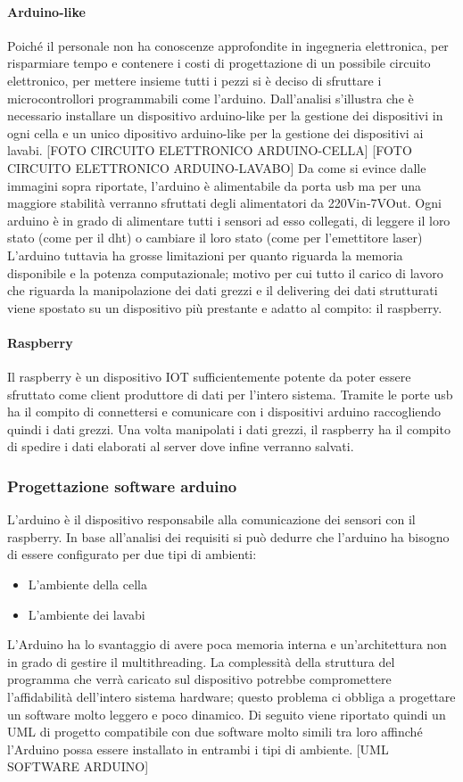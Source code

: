 \documentclass[12pt]{article}
\begin{document}
\paragraph{Arduino-like}
Poiché il personale non ha conoscenze approfondite in ingegneria elettronica, per risparmiare tempo e contenere i costi di progettazione di un possibile circuito elettronico, per mettere insieme tutti i pezzi si è deciso di sfruttare i microcontrollori programmabili come l'arduino.
Dall'analisi s'illustra che è necessario installare un dispositivo arduino-like per la gestione dei dispositivi in ogni cella e un unico dipositivo arduino-like per la gestione dei dispositivi ai lavabi.
[FOTO CIRCUITO ELETTRONICO ARDUINO-CELLA]
[FOTO CIRCUITO ELETTRONICO ARDUINO-LAVABO]
Da come si evince dalle immagini sopra riportate, l'arduino è alimentabile da porta usb ma per una maggiore stabilità verranno sfruttati degli alimentatori da 220Vin-7VOut.
Ogni arduino è in grado di alimentare tutti i sensori ad esso collegati, di leggere il loro stato (come per il dht) o cambiare il loro stato (come per l'emettitore laser)
L'arduino tuttavia ha grosse limitazioni per quanto riguarda la memoria disponibile e la potenza computazionale; motivo per cui tutto il carico di lavoro che riguarda la manipolazione dei dati grezzi e il delivering dei dati strutturati viene spostato su un dispositivo più prestante e adatto al compito: il raspberry.
\paragraph{Raspberry}
Il raspberry è un dispositivo IOT sufficientemente potente da poter essere sfruttato come client produttore di dati per l'intero sistema. Tramite le porte usb ha il compito di connettersi e comunicare con i dispositivi arduino raccogliendo quindi i dati grezzi.
Una volta manipolati i dati grezzi, il raspberry ha il compito di spedire i dati elaborati al server dove infine verranno salvati.
\subsubsection{Progettazione software arduino}
L'arduino è il dispositivo responsabile alla comunicazione dei sensori con il raspberry.
In base all'analisi dei requisiti si può dedurre che l'arduino ha bisogno di essere configurato per due tipi di ambienti:
\begin{itemize}
\item L'ambiente della cella
\item L'ambiente dei lavabi
\end{itemize}
L'Arduino ha lo svantaggio di avere poca memoria interna e un'architettura non in grado di gestire il multithreading. La complessità della struttura del programma che verrà caricato sul dispositivo potrebbe compromettere l'affidabilità dell'intero sistema hardware; questo problema ci obbliga a progettare un software molto leggero e poco dinamico.
Di seguito viene riportato quindi un UML di progetto compatibile con due software molto simili tra loro affinché l'Arduino possa essere installato in entrambi i tipi di ambiente. 
[UML SOFTWARE ARDUINO]
\end{document}
